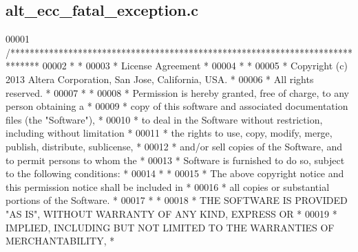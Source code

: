\subsection{alt\+\_\+ecc\+\_\+fatal\+\_\+exception.\+c}
\label{alt__ecc__fatal__exception_8c_source}

\begin{DoxyCode}
00001 \textcolor{comment}{/******************************************************************************}
00002 \textcolor{comment}{*                                                                             *}
00003 \textcolor{comment}{* License Agreement                                                           *}
00004 \textcolor{comment}{*                                                                             *}
00005 \textcolor{comment}{* Copyright (c) 2013 Altera Corporation, San Jose, California, USA.           *}
00006 \textcolor{comment}{* All rights reserved.                                                        *}
00007 \textcolor{comment}{*                                                                             *}
00008 \textcolor{comment}{* Permission is hereby granted, free of charge, to any person obtaining a     *}
00009 \textcolor{comment}{* copy of this software and associated documentation files (the "Software"),  *}
00010 \textcolor{comment}{* to deal in the Software without restriction, including without limitation   *}
00011 \textcolor{comment}{* the rights to use, copy, modify, merge, publish, distribute, sublicense,    *}
00012 \textcolor{comment}{* and/or sell copies of the Software, and to permit persons to whom the       *}
00013 \textcolor{comment}{* Software is furnished to do so, subject to the following conditions:        *}
00014 \textcolor{comment}{*                                                                             *}
00015 \textcolor{comment}{* The above copyright notice and this permission notice shall be included in  *}
00016 \textcolor{comment}{* all copies or substantial portions of the Software.                         *}
00017 \textcolor{comment}{*                                                                             *}
00018 \textcolor{comment}{* THE SOFTWARE IS PROVIDED "AS IS", WITHOUT WARRANTY OF ANY KIND, EXPRESS OR  *}
00019 \textcolor{comment}{* IMPLIED, INCLUDING BUT NOT LIMITED TO THE WARRANTIES OF MERCHANTABILITY,    *}

\end{DoxyCode}
